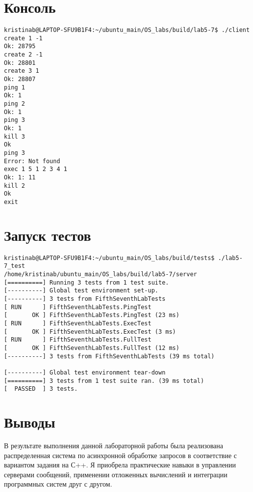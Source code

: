 \documentclass[a4paper, 12pt]{article}
\begin{document}
\newpage

\section{Консоль}
\begin{verbatim}
kristinab@LAPTOP-SFU9B1F4:~/ubuntu_main/OS_labs/build/lab5-7$ ./client
create 1 -1
Ok: 28795
create 2 -1
Ok: 28801
create 3 1
Ok: 28807
ping 1
Ok: 1
ping 2
Ok: 1
ping 3
Ok: 1
kill 3
Ok
ping 3
Error: Not found
exec 1 5 1 2 3 4 1
Ok: 1: 11
kill 2
Ok
exit
\end{verbatim}

\section{Запуск тестов}
\begin{verbatim}
kristinab@LAPTOP-SFU9B1F4:~/ubuntu_main/OS_labs/build/tests$ ./lab5-7_test
/home/kristinab/ubuntu_main/OS_labs/build/lab5-7/server
[==========] Running 3 tests from 1 test suite.
[----------] Global test environment set-up.
[----------] 3 tests from FifthSeventhLabTests
[ RUN      ] FifthSeventhLabTests.PingTest
[       OK ] FifthSeventhLabTests.PingTest (23 ms)
[ RUN      ] FifthSeventhLabTests.ExecTest
[       OK ] FifthSeventhLabTests.ExecTest (3 ms)
[ RUN      ] FifthSeventhLabTests.FullTest
[       OK ] FifthSeventhLabTests.FullTest (12 ms)
[----------] 3 tests from FifthSeventhLabTests (39 ms total)

[----------] Global test environment tear-down
[==========] 3 tests from 1 test suite ran. (39 ms total)
[  PASSED  ] 3 tests.
\end{verbatim}
\newpage

\section{Выводы}

В результате выполнения данной лабораторной работы была реализована распределенная система по асинхронной обработке запросов в соответствие с вариантом задания на С++. Я приобрела практические навыки в управлении серверами сообщений, применении отложенных вычислений и интеграции программных систем друг с другом.
\end{document}
